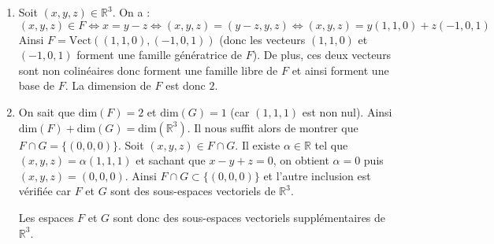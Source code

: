 \documentclass[a4paper,twoside,french,11pt]{VcCours}
\begin{document}
\corr \begin{enumerate}
\item Soit $(x,y,z) \in \mathbb{R}^3$. On a :
$$ (x,y,z) \in F \Longleftrightarrow x=y-z \Longleftrightarrow (x,y,z) = (y-z,y,z) \Longleftrightarrow (x,y,z) = y(1,1,0) + z(-1,0,1)$$
Ainsi $F = \textrm{Vect}((1,1,0), (-1,0,1))$ (donc les vecteurs $(1,1,0)$ et $(-1,0,1)$ forment une famille génératrice de $F$). De plus, ces deux vecteurs sont non colinéaires donc forment une famille libre de $F$ et ainsi forment une base de $F$. La dimension de $F$ est donc $2$.
\item On sait que $\textrm{dim}(F)=2$ et $\textrm{dim}(G)=1$ (car $(1,1,1)$ est non nul). Ainsi $\textrm{dim}(F) + \textrm{dim}(G) = \textrm{dim}(\mathbb{R}^3)$. Il nous suffit alors de montrer que $F \cap G = \lbrace (0,0,0) \rbrace$. Soit $(x,y,z) \in F \cap G$. Il existe $\alpha \in \mathbb{R}$ tel que $(x,y,z) = \alpha (1,1,1)$ et sachant que $x-y+z=0$, on obtient $\alpha = 0$ puis $(x,y,z)=(0,0,0)$. Ainsi $F \cap G \subset \lbrace (0,0,0) \rbrace$ et l'autre inclusion est vérifiée car $F$ et $G$ sont des sous-espaces vectoriels de $\mathbb{R}^3$.

\medskip

Les espaces $F$ et $G$ sont donc des sous-espaces vectoriels supplémentaires de $\mathbb{R}^3$.
\end{enumerate}
\end{document}
